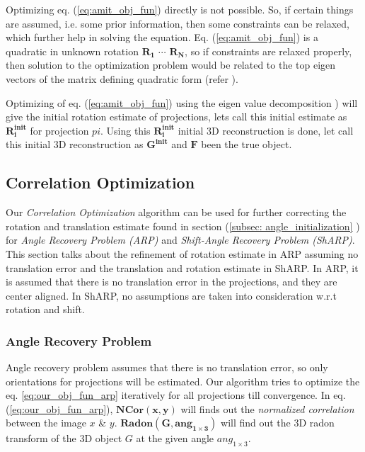 \documentclass[twoside]{iitbreport}
\begin{document}
Optimizing eq. (\ref{eq:amit_obj_fun}) directly is not possible. So, if certain things are assumed, i.e. some prior information, then some constraints can be relaxed, which further help in solving the equation.  Eq. (\ref{eq:amit_obj_fun}) is a quadratic in unknown rotation ${\boldsymbol{R_1}}$ ${\cdots}$ ${\boldsymbol{R_N}}$, so if constraints are relaxed properly, then solution to the optimization problem would be related to the top eigen vectors of the matrix defining quadratic form (refer  \cite{singer2009threeAngleEstimate}). 

Optimizing of eq. (\ref{eq:amit_obj_fun}) using the eigen value decomposition \cite{singer2009threeAngleEstimate}) will give the initial rotation estimate of projections, lets call this initial estimate as ${\boldsymbol{R_i^{init}}}$ for projection ${pi}$. Using this ${\boldsymbol{R_i^{init}}}$ initial 3D reconstruction is done, let call this initial 3D reconstruction as ${\boldsymbol{G^{init}}}$ and ${\boldsymbol{F}}$ been the true object.     

\subsection{Correlation Optimization}

Our \textit{Correlation Optimization} algorithm can be used for further correcting the rotation and translation estimate found in section (\ref{subsec: angle_initialization} ) for \textit{Angle Recovery Problem (ARP)} and \textit{Shift-Angle Recovery Problem (ShARP)}.  This section talks about the refinement of rotation estimate in ARP assuming no translation error and the translation and rotation estimate in ShARP. In ARP, it is assumed that there is no translation error in the projections, and they are center aligned. In ShARP, no assumptions are taken into consideration w.r.t rotation and shift.

\subsubsection{\textbf{Angle Recovery Problem}}

Angle recovery problem assumes that there is no translation error, so only orientations for projections will be estimated. Our algorithm tries to optimize the eq. \ref{eq:our_obj_fun_arp} iteratively for all projections till convergence. In eq. (\ref{eq:our_obj_fun_arp}), ${\boldsymbol{NCor(x,y)}}$ will finds out the \textit{normalized correlation} between the image ${x}$ \& ${y}$. ${\boldsymbol{Radon(G,ang_{1\times 3})}}$ will find out the 3D radon transform of the 3D object ${G}$ at the given angle ${ang_{1 \times 3}}$.    
\end{document}
